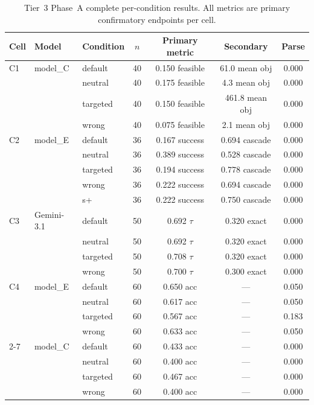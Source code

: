 \begin{table}[t]
\caption{Tier~3 Phase~A complete per-condition results. All metrics are primary confirmatory endpoints per cell.}
\label{tab:tier3_all_conditions}
\centering
\scriptsize
\setlength{\tabcolsep}{3.5pt}
\renewcommand{\arraystretch}{1.08}
\begin{tabular}{lllcccc}
\toprule
Cell & Model & Condition & $n$ & Primary metric & Secondary & Parse \\
\midrule
C1 & model_C & default   & 40 & 0.150 feasible & 61.0 mean obj & 0.000 \\
   &         & neutral   & 40 & 0.175 feasible & 4.3 mean obj  & 0.000 \\
   &         & targeted  & 40 & 0.150 feasible & 461.8 mean obj & 0.000 \\
   &         & wrong     & 40 & 0.075 feasible & 2.1 mean obj  & 0.000 \\
\midrule
C2 & model_E & default   & 36 & 0.167 success & 0.694 cascade & 0.000 \\
   &            & neutral   & 36 & 0.389 success & 0.528 cascade & 0.000 \\
   &            & targeted  & 36 & 0.194 success & 0.778 cascade & 0.000 \\
   &            & wrong     & 36 & 0.222 success & 0.694 cascade & 0.000 \\
   &            & s+        & 36 & 0.222 success & 0.750 cascade & 0.000 \\
\midrule
C3 & Gemini-3.1 & default   & 50 & 0.692 $\tau$ & 0.320 exact & 0.000 \\
   &            & neutral   & 50 & 0.692 $\tau$ & 0.320 exact & 0.000 \\
   &            & targeted  & 50 & 0.708 $\tau$ & 0.320 exact & 0.000 \\
   &            & wrong     & 50 & 0.700 $\tau$ & 0.300 exact & 0.000 \\
\midrule
C4 & model_E & default   & 60 & 0.650 acc & --- & 0.050 \\
   &            & neutral   & 60 & 0.617 acc & --- & 0.050 \\
   &            & targeted  & 60 & 0.567 acc & --- & 0.183 \\
   &            & wrong     & 60 & 0.633 acc & --- & 0.050 \\
\cmidrule{2-7}
   & model_C    & default   & 60 & 0.433 acc & --- & 0.000 \\
   &            & neutral   & 60 & 0.400 acc & --- & 0.000 \\
   &            & targeted  & 60 & 0.467 acc & --- & 0.000 \\
   &            & wrong     & 60 & 0.400 acc & --- & 0.000 \\
\bottomrule
\end{tabular}
\end{table}

